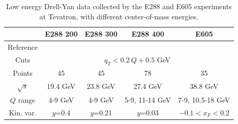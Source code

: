 \documentclass[aps,preprintnumbers,showpacs,nofootinbib,superscriptaddress,floatfix]{revtex4}
\begin{document}
\begin{table}[h!]
\begin{center}
\renewcommand{\tabcolsep}{0.4pc} %
\renewcommand{\arraystretch}{1.2} %
\begin{tabular}{|c|c|c|c|c|}
 \hline
 ~                        &  E288 200    &  E288 300        &  E288 400          &  E605                \\
 \hline
Reference               &  \cite{Ito:1980ev}  &   \cite{Ito:1980ev}  &  \cite{Ito:1980ev}  &   \cite{Moreno:1990sf}  \\
\hline
Cuts             & \multicolumn{4}{c|}{$q_T < 0.2\ Q +0.5$ GeV}
\\
 \hline
 Points                   &      45      &   45             &       78           &     35               \\
 \hline
 $\sqrt{s}$               &    19.4 GeV   &   23.8 GeV        &      27.4 GeV    &  38.8 GeV           \\
\hline
$Q$ range                 &  4-9 GeV      &  4-9 GeV         &  5-9, 11-14 GeV   &  7-9, 10.5-18 GeV   \\
 \hline
 Kin. var.           & $y$=0.4         &  $y$=0.21          &   $y$=0.03         &    $-0.1<x_F< 0.2$         \\
\hline
\end{tabular}
\caption{Low energy Drell-Yan data collected by the E288 and E605 experiments at Tevatron, with different center-of-mass energies.}
\label{t:data_DY}
\end{center}
\end{table}
\end{document}
